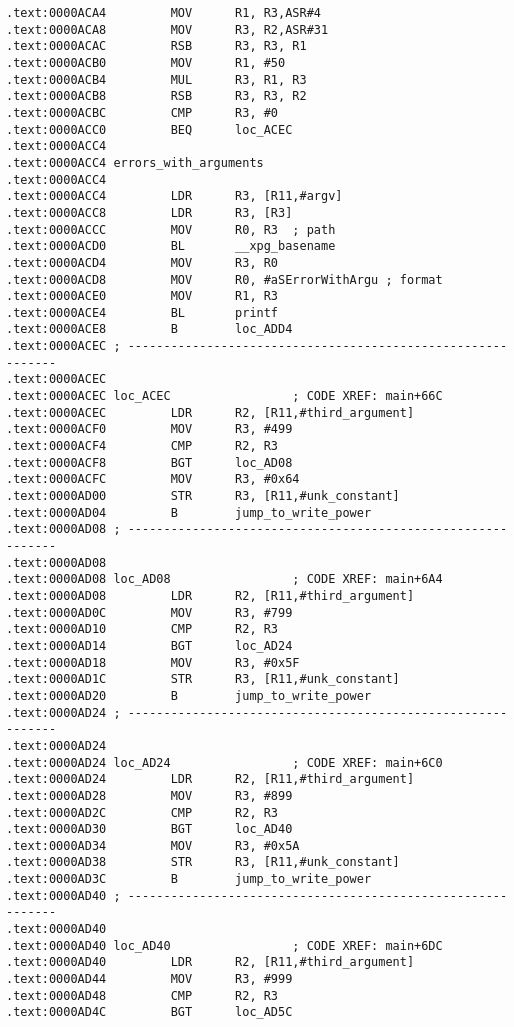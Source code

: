 \begin{lstlisting}[style=customasmARM]
.text:0000ACA4         MOV      R1, R3,ASR#4
.text:0000ACA8         MOV      R3, R2,ASR#31
.text:0000ACAC         RSB      R3, R3, R1
.text:0000ACB0         MOV      R1, #50
.text:0000ACB4         MUL      R3, R1, R3
.text:0000ACB8         RSB      R3, R3, R2
.text:0000ACBC         CMP      R3, #0
.text:0000ACC0         BEQ      loc_ACEC
.text:0000ACC4
.text:0000ACC4 errors_with_arguments
.text:0000ACC4                                         
.text:0000ACC4         LDR      R3, [R11,#argv]
.text:0000ACC8         LDR      R3, [R3]
.text:0000ACCC         MOV      R0, R3  ; path
.text:0000ACD0         BL       __xpg_basename
.text:0000ACD4         MOV      R3, R0
.text:0000ACD8         MOV      R0, #aSErrorWithArgu ; format
.text:0000ACE0         MOV      R1, R3
.text:0000ACE4         BL       printf
.text:0000ACE8         B        loc_ADD4
.text:0000ACEC ; ------------------------------------------------------------
.text:0000ACEC
.text:0000ACEC loc_ACEC                 ; CODE XREF: main+66C
.text:0000ACEC         LDR      R2, [R11,#third_argument]
.text:0000ACF0         MOV      R3, #499
.text:0000ACF4         CMP      R2, R3
.text:0000ACF8         BGT      loc_AD08
.text:0000ACFC         MOV      R3, #0x64
.text:0000AD00         STR      R3, [R11,#unk_constant]
.text:0000AD04         B        jump_to_write_power
.text:0000AD08 ; ------------------------------------------------------------
.text:0000AD08
.text:0000AD08 loc_AD08                 ; CODE XREF: main+6A4
.text:0000AD08         LDR      R2, [R11,#third_argument]
.text:0000AD0C         MOV      R3, #799
.text:0000AD10         CMP      R2, R3
.text:0000AD14         BGT      loc_AD24
.text:0000AD18         MOV      R3, #0x5F
.text:0000AD1C         STR      R3, [R11,#unk_constant]
.text:0000AD20         B        jump_to_write_power
.text:0000AD24 ; ------------------------------------------------------------
.text:0000AD24
.text:0000AD24 loc_AD24                 ; CODE XREF: main+6C0
.text:0000AD24         LDR      R2, [R11,#third_argument]
.text:0000AD28         MOV      R3, #899
.text:0000AD2C         CMP      R2, R3
.text:0000AD30         BGT      loc_AD40
.text:0000AD34         MOV      R3, #0x5A
.text:0000AD38         STR      R3, [R11,#unk_constant]
.text:0000AD3C         B        jump_to_write_power
.text:0000AD40 ; ------------------------------------------------------------
.text:0000AD40
.text:0000AD40 loc_AD40                 ; CODE XREF: main+6DC
.text:0000AD40         LDR      R2, [R11,#third_argument]
.text:0000AD44         MOV      R3, #999
.text:0000AD48         CMP      R2, R3
.text:0000AD4C         BGT      loc_AD5C

\end{lstlisting}
